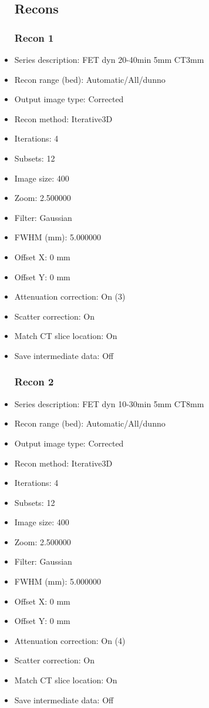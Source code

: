 \documentclass[12pt]{article}
\begin{document}
\begin{itemize}
\subsection{Recons}
\subsubsection{Recon 1}
\item Series description: FET dyn 20-40min 5mm CT3mm
\item Recon range (bed): Automatic/All/dunno
\item Output image type: Corrected
\item Recon method: Iterative3D
\item Iterations: 4
\item Subsets: 12
\item Image size: 400
\item Zoom: 2.500000
\item Filter: Gaussian
\item FWHM (mm): 5.000000
\item Offset X: 0 mm
\item Offset Y: 0 mm
\item Attenuation correction: On (3)
\item Scatter correction: On
\item Match CT slice location: On
\item Save intermediate data: Off
\subsubsection{Recon 2}
\item Series description: FET dyn 10-30min 5mm CT8mm
\item Recon range (bed): Automatic/All/dunno
\item Output image type: Corrected
\item Recon method: Iterative3D
\item Iterations: 4
\item Subsets: 12
\item Image size: 400
\item Zoom: 2.500000
\item Filter: Gaussian
\item FWHM (mm): 5.000000
\item Offset X: 0 mm
\item Offset Y: 0 mm
\item Attenuation correction: On (4)
\item Scatter correction: On
\item Match CT slice location: On
\item Save intermediate data: Off

\end{itemize}
\end{document}
